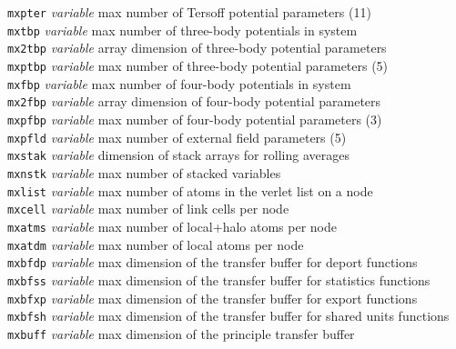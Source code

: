 \begin{tabbing}
\> {\tt mxpter}      \> {\em variable}     \> max number of Tersoff potential parameters (11) \\
\> {\tt mxtbp}       \> {\em variable}     \> max number of three-body potentials in system \\
\> {\tt mx2tbp}      \> {\em variable}     \> array dimension of three-body potential parameters \\
\> {\tt mxptbp}      \> {\em variable}     \> max number of three-body potential parameters (5) \\
\> {\tt mxfbp}       \> {\em variable}     \> max number of four-body potentials in system \\
\> {\tt mx2fbp}      \> {\em variable}     \> array dimension of four-body potential parameters \\
\> {\tt mxpfbp}      \> {\em variable}     \> max number of four-body potential parameters (3) \\
\> {\tt mxpfld}      \> {\em variable}     \> max number of external field parameters (5) \\
\> {\tt mxstak}      \> {\em variable}     \> dimension of stack arrays for rolling averages \\
\> {\tt mxnstk}      \> {\em variable}     \> max number of stacked variables \\
\> {\tt mxlist}      \> {\em variable}     \> max number of atoms in the verlet list on a node \\
\> {\tt mxcell}      \> {\em variable}     \> max number of link cells per node \\
\> {\tt mxatms}      \> {\em variable}     \> max number of local+halo atoms per node \\
\> {\tt mxatdm}      \> {\em variable}     \> max number of local atoms per node \\
\> {\tt mxbfdp}      \> {\em variable}     \> max dimension of the transfer buffer for deport functions \\
\> {\tt mxbfss}      \> {\em variable}     \> max dimension of the transfer buffer for statistics functions \\
\> {\tt mxbfxp}      \> {\em variable}     \> max dimension of the transfer buffer for export functions \\
\> {\tt mxbfsh}      \> {\em variable}     \> max dimension of the transfer buffer for shared units functions \\
\> {\tt mxbuff}      \> {\em variable}     \> max dimension of the principle transfer buffer \\

\end{tabbing}
